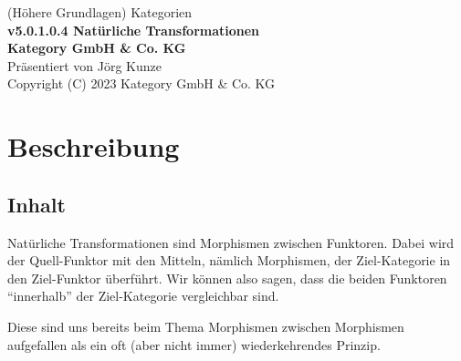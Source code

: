 \documentclass[a4paper]{amsart}
\theoremstyle{definition}
\begin{document}
\begin{titlepage}
\centering
{\huge
(Höhere Grundlagen) Kategorien\\[1cm]
\textbf{v5.0.1.0.4 Natürliche Transformationen}
}\\[1cm]

\textbf{Kategory GmbH \& Co. KG}\\
Präsentiert von Jörg Kunze\\
Copyright (C) 2023 Kategory GmbH \& Co. KG

\end{titlepage}

%

\newpage

\section*{Beschreibung}

\subsection*{Inhalt}
Natürliche Transformationen sind Morphismen zwischen Funktoren. Dabei wird der Quell-Funktor mit den Mitteln, nämlich Morphismen, der Ziel-Kategorie in den Ziel-Funktor überführt. Wir können also sagen, dass die beiden Funktoren "`innerhalb"' der Ziel-Kategorie vergleichbar sind.

Diese sind uns bereits beim Thema Morphismen zwischen Morphismen aufgefallen als ein oft  (aber nicht immer) wiederkehrendes Prinzip.
\end{document}
